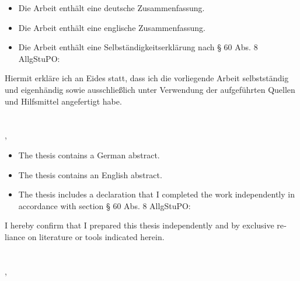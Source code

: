 \begin{otherlanguage}{ngerman}
\begin{itemize}[label={\checkmark}]
\item Die Arbeit enthält eine deutsche Zusammenfassung.  
\item Die Arbeit enthält eine englische Zusammenfassung.
\item  Die Arbeit enthält eine Selbständigkeitserklärung nach § 60 Abs. 8 AllgStuPO:
\end{itemize}
Hiermit erkläre ich an Eides statt, dass ich die vorliegende Arbeit selbstständig und eigenhändig sowie ausschließlich unter Verwendung der aufgeführten Quellen und Hilfsmittel angefertigt habe.\\[1cm]
\makebox[3in][l]{\hrulefill}\\
\textsc{\firstauthor} \\
\myplace, \monthyeardate
\end{otherlanguage}
\vfill
\begin{otherlanguage}{english}
\begin{itemize}[label={\checkmark}]
\item The thesis contains a German abstract.   
\item The thesis contains an English abstract. 
\item The thesis includes a declaration that I completed the work independently in accordance with section § 60 Abs. 8 AllgStuPO:
\end{itemize}
I hereby confirm that I prepared this thesis independently and by exclusive reliance on literature or tools indicated herein.\\[1cm]
\makebox[3in][l]{\hrulefill}\\
\textsc{\firstauthor} \\
\myplace, \monthyeardate
\end{otherlanguage}